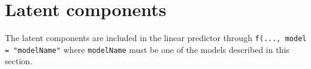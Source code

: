 \chapter{Latent components}
The latent components are included in the linear predictor through 
\texttt{f(..., model = "modelName"} where \texttt{modelName} must
be one of the models described in this section.

\localtableofcontents

